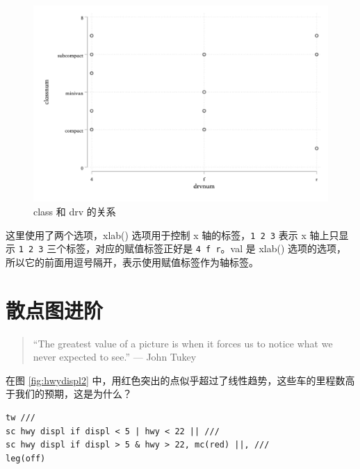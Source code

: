 \begin{solution}
  \begin{figure}[htbp]
    \centering
    \includegraphics[width=\textwidth]{assets/classnumdrvnum2.png}
    \caption{class 和 drv 的关系}
    \label{fig:classnumdrvnum2}
  \end{figure}

  这里使用了两个选项，xlab() 选项用于控制 x 轴的标签，\texttt{1 2 3} 表示 x 轴上只显示 \texttt{1 2 3} 三个标签，对应的赋值标签正好是 \texttt{4 f r}。val 是 xlab() 选项的选项，所以它的前面用逗号隔开，表示使用赋值标签作为轴标签。
\end{solution}

\section{散点图进阶}
\begin{quote}
``The greatest value of a picture is when it forces us to notice what we never expected to see.'' --- John Tukey
\end{quote}

在图 \ref{fig:hwydispl2} 中，用红色突出的点似乎超过了线性趋势，这些车的里程数高于我们的预期，这是为什么？

\begin{lstlisting}
tw ///
sc hwy displ if displ < 5 | hwy < 22 || ///
sc hwy displ if displ > 5 & hwy > 22, mc(red) ||, ///
leg(off)
\end{lstlisting}

